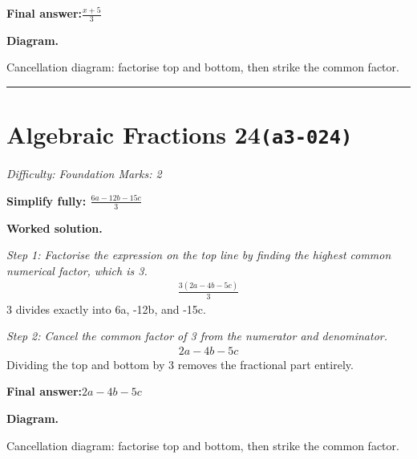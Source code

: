 \documentclass[11pt]{article}
\newcommand{\question}[1]{\par\medskip\noindent\textbf{#1}\par}
\begin{document}
\begin{answerbox}
\textbf{Final answer:}\quad \(\displaystyle \frac{x+5}{3}\)
\end{answerbox}
\textbf{Diagram.}

\begin{center}
\end{center}
\small Cancellation diagram: factorise top and bottom, then strike the common factor.\normalsize

\medskip\hrule

\section*{Algebraic Fractions 24\quad\small\texttt{(a3-024)}}
\textit{Difficulty: Foundation \quad\textbar\quad Marks: 2}

\question{Simplify fully: \( \frac{6a-12b-15c}{3} \)}

\textbf{Worked solution.}

\textit{Step 1: Factorise the expression on the top line by finding the highest common numerical factor, which is 3.}
\[\begin{gathered}
\frac{3(2a-4b-5c)}{3}
\end{gathered}\]
3 divides exactly into 6a, -12b, and -15c.

\textit{Step 2: Cancel the common factor of 3 from the numerator and denominator.}
\[\begin{gathered}
2a-4b-5c
\end{gathered}\]
Dividing the top and bottom by 3 removes the fractional part entirely.

\begin{answerbox}
\textbf{Final answer:}\quad \(\displaystyle 2a-4b-5c\)
\end{answerbox}
\textbf{Diagram.}

\begin{center}
\end{center}
\small Cancellation diagram: factorise top and bottom, then strike the common factor.\normalsize
\end{document}
